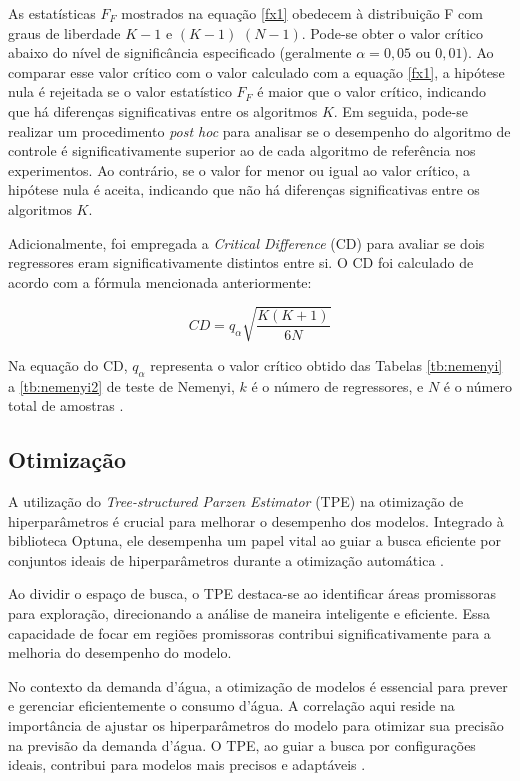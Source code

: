  
As estatísticas $F_F$ mostrados na equação \eqref{fx1} obedecem à distribuição F com graus de liberdade $K-1$ e $(K-1)$ $(N-1)$. Pode-se obter o valor crítico abaixo do nível de significância especificado (geralmente $\alpha = 0,05$ ou $0,01$). Ao comparar esse valor crítico com o valor calculado com a equação \eqref{fx1}, a hipótese nula é rejeitada se o valor estatístico $F_F$ é maior que o valor crítico, indicando que há diferenças significativas entre os algoritmos $K$. Em seguida, pode-se realizar um procedimento \textit{post hoc} para analisar se o desempenho do algoritmo de controle é significativamente superior ao de cada algoritmo de referência nos experimentos. Ao contrário, se o valor for menor ou igual ao valor crítico, a hipótese nula é aceita, indicando que não há diferenças significativas entre os algoritmos $K$.
  
Adicionalmente, foi empregada a \textit{Critical Difference} (CD) para avaliar se dois regressores eram significativamente distintos entre si. O CD foi calculado de acordo com a fórmula mencionada anteriormente:

\begin{equation}
	CD = q_\alpha \sqrt{\frac{K(K+1)}{6N}}
\end{equation}

\noindent Na equação do CD, $q_\alpha$ representa o valor crítico obtido das Tabelas \ref{tb:nemenyi} a \ref{tb:nemenyi2} de teste de Nemenyi, $k$ é o número de regressores, e $N$ é o número total de amostras \cite{Liu2022}.
 
 
 \subsection{Otimiza\c c\~ao}
 
A utilização do \textit{Tree-structured Parzen Estimator} (TPE) na otimização de hiperparâmetros é crucial para melhorar o desempenho dos modelos. Integrado à biblioteca Optuna, ele desempenha um papel vital ao guiar a busca eficiente por conjuntos ideais de hiperparâmetros durante a otimização automática \cite{tpe}.

Ao dividir o espaço de busca, o TPE destaca-se ao identificar áreas promissoras para exploração, direcionando a análise de maneira inteligente e eficiente. Essa capacidade de focar em regiões promissoras contribui significativamente para a melhoria do desempenho do modelo.

No contexto da demanda d'água, a otimização de modelos é essencial para prever e gerenciar eficientemente o consumo d'água. A correlação aqui reside na importância de ajustar os hiperparâmetros do modelo para otimizar sua precisão na previsão da demanda d'água. O TPE, ao guiar a busca por configurações ideais, contribui para modelos mais precisos e adaptáveis \cite{tpe}.


